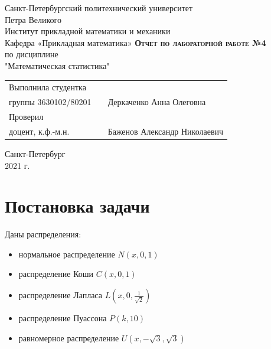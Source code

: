 \documentclass[12pt,a4paper]{article}
\begin{document}
    \begin{titlepage}
        \begin{center}
            \large
            Санкт-Петербургский политехнический университет\\Петра Великого\\
            \vspace{0.5cm}
            Институт прикладной математики и механики\\
            \vspace{0.25cm}
            Кафедра «Прикладная математика»
            \vfill
            \textsc{\LARGE\textbf{Отчет по лабораторной работе №4}}\\[5mm]
            \Large
            по дисциплине\\"Математическая статистика"
        \end{center}
        \vfill
        \begin{tabular}{l p{} l}
            Выполнила студентка\\группы 3630102/80201 && Деркаченко Анна Олеговна
            \vspace{0.25cm}
            \\Проверил\\доцент, к.ф.-м.н. && Баженов Александр Николаевич
        \end{tabular}
        \vfill
        \begin{center}
            Санкт-Петербург\\2021 г.
        \end{center}
    \end{titlepage}

\newpage
\begin{center}
    \tableofcontents
    \setcounter{page}{2}
\end{center}
\newpage
\begin{center}
    \listoffigures
\end{center}

\newpage
\section{Постановка задачи}
Даны распределения:
\begin{itemize}
    \item нормальное распределение $N(x,0,1)$
    \item распределение Коши $C(x,0,1)$
    \item распределение Лапласа $L(x,0,\frac{1}{\sqrt{2}})$
    \item распределение Пуассона $P(k,10)$
    \item равномерное распределение $U(x,-\sqrt{3},\sqrt{3})$
\end{itemize}
\end{document}

